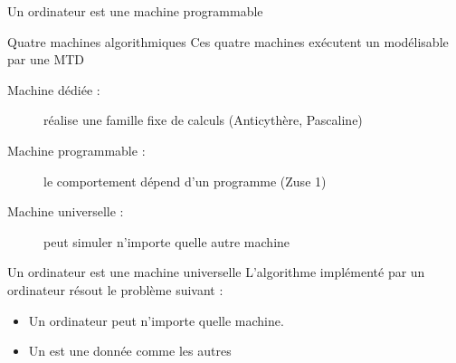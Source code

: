 
\begingroup

\begin{frame}{Un ordinateur est une machine programmable}

  \begin{block}{Quatre machines algorithmiques}
    Ces quatre machines exécutent un  modélisable par une MTD
    \begin{description}
    \item[Machine dédiée :] réalise une famille fixe de calculs (Anticythère, Pascaline)
    \item[Machine programmable :] le comportement dépend d'un programme (Zuse 1)
    \item[Machine universelle :] peut simuler n'importe quelle autre machine
    \end{description}
  \end{block}
      
  \begin{block}{Un ordinateur est une machine universelle}
    L'algorithme implémenté par un ordinateur résout le problème suivant :
    \begin{itemize}
      \item Un ordinateur peut  n'importe quelle machine.
      \item Un  est une \alert{donnée} comme les autres
    \end{itemize}
  \end{block}
  
\end{frame}

\endgroup
\endinput
